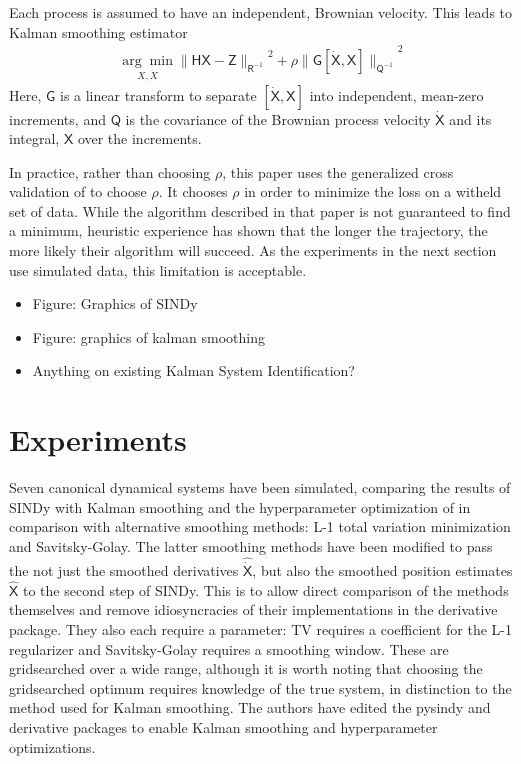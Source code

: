 \documentclass{article}
\newcommand{\mat}[1]{\boldsymbol{\mathsf{#1}}}
\begin{document}
Each process is assumed to have an independent, Brownian velocity.  This leads to Kalman smoothing estimator
\begin{align}
    \underset{X, \dot X}{\arg\min}{\|\mat H \mat X - \mat Z\|_{\mat R^{-1}}}^2 + \rho {\|\mat G [\mat {\dot X}, \mat X]\|_{\mat Q^{-1}}}^2
\end{align}
Here, $\mat G$ is a linear transform to separate $[\mat{\dot X}, \mat X]$ into independent, mean-zero increments, and $\mat Q$ is the covariance of the Brownian process velocity $\mat{\dot X}$ and its integral, $\mat X$ over the increments.

In practice, rather than choosing $\rho$, this paper uses the generalized cross validation of \cite{Barratt2020} to choose $\rho$.  It chooses $\rho$ in order to minimize the loss on a witheld set of data.  While the algorithm described in that paper is not guaranteed to find a minimum, heuristic experience has shown that the longer the trajectory, the more likely their algorithm will succeed.  As the experiments in the next section use simulated data, this limitation is acceptable.

\begin{itemize}
    \item Figure: Graphics of SINDy
    \item Figure: graphics of kalman smoothing
    \item Anything on existing Kalman System Identification?
\end{itemize}

\section{Experiments}

Seven canonical dynamical systems have been simulated, comparing the results of SINDy with Kalman smoothing and the hyperparameter optimization of \cite{Barratt2020} in comparison with alternative smoothing methods: L-1 total variation minimization and Savitsky-Golay.  The latter smoothing methods have been modified to pass the not just the smoothed derivatives $\mat{\widehat{\dot X}}$, but also the smoothed position estimates $\mat {\widehat X}$ to the second step of SINDy.  This is to allow direct comparison of the methods themselves and remove idiosyncracies of their implementations in the derivative package.  They also each require a parameter: TV requires a coefficient for the L-1 regularizer and Savitsky-Golay requires a smoothing window.  These are gridsearched over a wide range, although it is worth noting that choosing the gridsearched optimum requires knowledge of the true system, in distinction to the method used for Kalman smoothing.  The authors have edited the pysindy and derivative packages to enable Kalman smoothing and hyperparameter optimizations.
\end{document}
